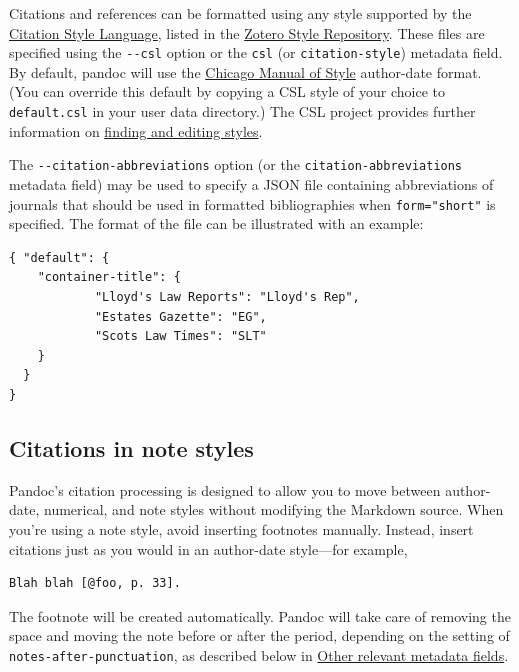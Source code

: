 \documentclass[
]{article}
\begin{document}
Citations and references can be formatted using any style supported by
the \href{https://citationstyles.org}{Citation Style Language}, listed
in the \href{https://www.zotero.org/styles}{Zotero Style Repository}.
These files are specified using the \texttt{-\/-csl} option or the
\texttt{csl} (or \texttt{citation-style}) metadata field. By default,
pandoc will use the \href{https://chicagomanualofstyle.org}{Chicago
Manual of Style} author-date format. (You can override this default by
copying a CSL style of your choice to \texttt{default.csl} in your user
data directory.) The CSL project provides further information on
\href{https://citationstyles.org/authors/}{finding and editing styles}.

The \texttt{-\/-citation-abbreviations} option (or the
\texttt{citation-abbreviations} metadata field) may be used to specify a
JSON file containing abbreviations of journals that should be used in
formatted bibliographies when \texttt{form="short"} is specified. The
format of the file can be illustrated with an example:

\begin{verbatim}
{ "default": {
    "container-title": {
            "Lloyd's Law Reports": "Lloyd's Rep",
            "Estates Gazette": "EG",
            "Scots Law Times": "SLT"
    }
  }
}
\end{verbatim}

\hypertarget{citations-in-note-styles}{%
\subsection{Citations in note styles}\label{citations-in-note-styles}}

Pandoc's citation processing is designed to allow you to move between
author-date, numerical, and note styles without modifying the Markdown
source. When you're using a note style, avoid inserting footnotes
manually. Instead, insert citations just as you would in an author-date
style---for example,

\begin{verbatim}
Blah blah [@foo, p. 33].
\end{verbatim}

The footnote will be created automatically. Pandoc will take care of
removing the space and moving the note before or after the period,
depending on the setting of \texttt{notes-after-punctuation}, as
described below in
\protect\hyperlink{other-relevant-metadata-fields}{Other relevant
metadata fields}.
\end{document}
